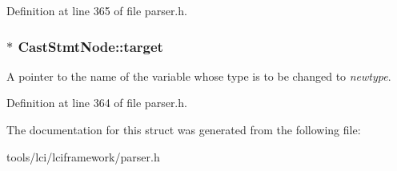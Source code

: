 Definition at line 365 of file parser.\-h.

\hypertarget{struct_cast_stmt_node_a89d56358f0a8fc4d4fb0df7029ea494e}{
\subsubsection[{target}]{$\ast$ {\bf Cast\-Stmt\-Node\-::target}}}\label{struct_cast_stmt_node_a89d56358f0a8fc4d4fb0df7029ea494e}
A pointer to the name of the variable whose type is to be changed to {\itshape newtype\/}. 

Definition at line 364 of file parser.\-h.



The documentation for this struct was generated from the following file\-:\begin{DoxyCompactItemize}
\item 
tools/lci/lciframework/parser.\-h\end{DoxyCompactItemize}
